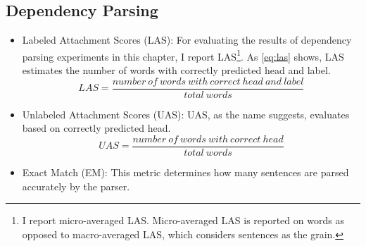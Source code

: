 \subsection{Dependency Parsing}
    \begin{itemize}
        \item Labeled Attachment Scores (LAS): For evaluating the results of dependency parsing experiments in this chapter, I report LAS\footnote{I report micro-averaged LAS. Micro-averaged LAS is reported on words as opposed to macro-averaged LAS, which considers sentences as the grain.}.  As \ref{eq:las} shows, LAS estimates the number of words with correctly predicted head and label.
        \begin{equation} \label{eq:las}
            LAS = \frac{number\ of\ words\ with\ correct\ head\ and\ label}{total\ words}
        \end{equation}
        
        \item Unlabeled Attachment Scores (UAS): UAS, as the name suggests, evaluates based on correctly predicted head. 
        \begin{equation} \label{eq:uas}
            UAS = \frac{number\ of\ words\ with\ correct\ head}{total\ words}
        \end{equation}
        
        \item Exact Match (EM): This metric determines how many sentences are parsed accurately by the parser.
        
    \end{itemize}





